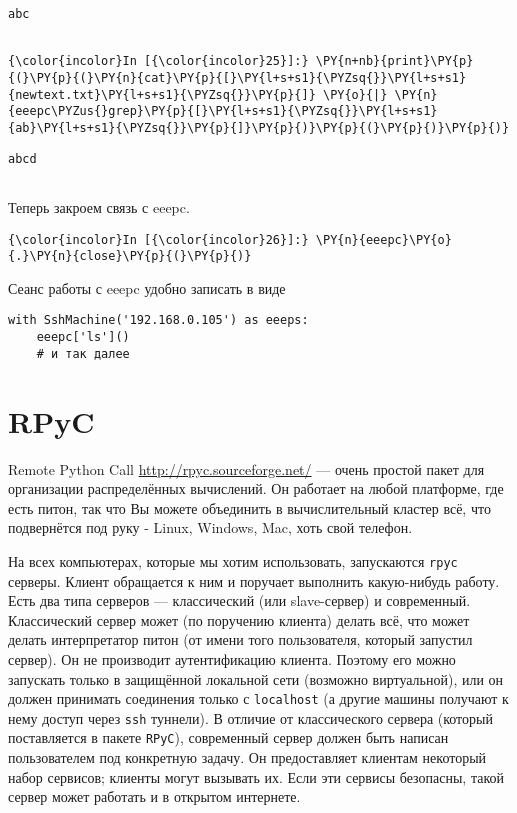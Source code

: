     \begin{Verbatim}[commandchars=\\\{\}]
abc


    \end{Verbatim}

    \begin{Verbatim}[commandchars=\\\{\}]
{\color{incolor}In [{\color{incolor}25}]:} \PY{n+nb}{print}\PY{p}{(}\PY{p}{(}\PY{n}{cat}\PY{p}{[}\PY{l+s+s1}{\PYZsq{}}\PY{l+s+s1}{newtext.txt}\PY{l+s+s1}{\PYZsq{}}\PY{p}{]} \PY{o}{|} \PY{n}{eeepc\PYZus{}grep}\PY{p}{[}\PY{l+s+s1}{\PYZsq{}}\PY{l+s+s1}{ab}\PY{l+s+s1}{\PYZsq{}}\PY{p}{]}\PY{p}{)}\PY{p}{(}\PY{p}{)}\PY{p}{)}
\end{Verbatim}


    \begin{Verbatim}[commandchars=\\\{\}]
abcd


    \end{Verbatim}

    Теперь закроем связь с eeepc.

    \begin{Verbatim}[commandchars=\\\{\}]
{\color{incolor}In [{\color{incolor}26}]:} \PY{n}{eeepc}\PY{o}{.}\PY{n}{close}\PY{p}{(}\PY{p}{)}
\end{Verbatim}


    Сеанс работы с eeepc удобно записать в виде

\begin{verbatim}
with SshMachine('192.168.0.105') as eeeps:
    eeepc['ls']()
    # и так далее
\end{verbatim}

\section{RPyC}
\label{S26b2}

Remote Python Call \url{http://rpyc.sourceforge.net/} --- очень простой
пакет для организации распределённых вычислений. Он работает на любой
платформе, где есть питон, так что Вы можете объединить в вычислительный
кластер всё, что подвернётся под руку - Linux, Windows, Mac, хоть свой
телефон.

На всех компьютерах, которые мы хотим использовать, запускаются
\texttt{rpyc} серверы. Клиент обращается к ним и поручает выполнить
какую-нибудь работу. Есть два типа серверов --- классический (или
slave-сервер) и современный. Классический сервер может (по поручению
клиента) делать всё, что может делать интерпретатор питон (от имени того
пользователя, который запустил сервер). Он не производит аутентификацию
клиента. Поэтому его можно запускать только в защищённой локальной сети
(возможно виртуальной), или он должен принимать соединения только с
\texttt{localhost} (а другие машины получают к нему доступ через
\texttt{ssh} туннели). В отличие от классического сервера (который
поставляется в пакете \texttt{RPyC}), современный сервер должен быть
написан пользователем под конкретную задачу. Он предоставляет клиентам
некоторый набор сервисов; клиенты могут вызывать их. Если эти сервисы
безопасны, такой сервер может работать и в открытом интернете.

